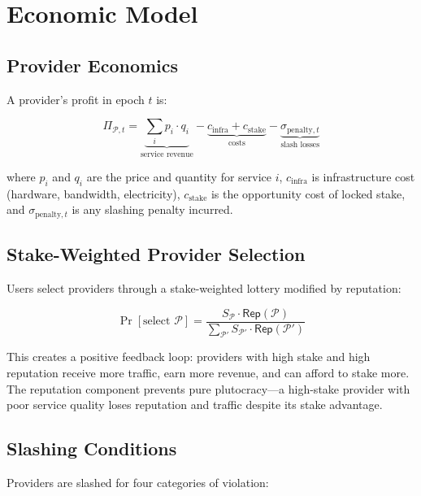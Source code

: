 \section{Economic Model}
\label{sec:economics}

\subsection{Provider Economics}

A provider's profit in epoch $t$ is:

\begin{equation}
    \Pi_{\mathcal{P}, t} = \underbrace{\sum_{i} p_i \cdot q_i}_{\text{service revenue}} - \underbrace{c_{\text{infra}} + c_{\text{stake}}}_{\text{costs}} - \underbrace{\sigma_{\text{penalty},t}}_{\text{slash losses}}
\end{equation}

where $p_i$ and $q_i$ are the price and quantity for service $i$,
$c_{\text{infra}}$ is infrastructure cost (hardware, bandwidth, electricity),
$c_{\text{stake}}$ is the opportunity cost of locked stake, and
$\sigma_{\text{penalty},t}$ is any slashing penalty incurred.

\subsection{Stake-Weighted Provider Selection}

Users select providers through a stake-weighted lottery modified by reputation:

\begin{equation}\label{eq:selection}
    \Pr[\text{select } \mathcal{P}] = \frac{S_{\mathcal{P}} \cdot \mathsf{Rep}(\mathcal{P})}{\sum_{\mathcal{P}'} S_{\mathcal{P}'} \cdot \mathsf{Rep}(\mathcal{P}')}
\end{equation}

This creates a positive feedback loop: providers with high stake and high
reputation receive more traffic, earn more revenue, and can afford to stake
more. The reputation component prevents pure plutocracy---a high-stake
provider with poor service quality loses reputation and traffic despite
its stake advantage.

\subsection{Slashing Conditions}

Providers are slashed for four categories of violation:

